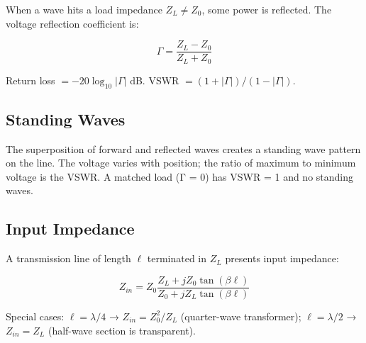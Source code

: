 				

When a wave hits a load impedance $Z_L \neq Z_0$, some power is reflected. The voltage reflection coefficient is:

				
\[\Gamma = \dfrac{Z_L - Z_0}{Z_L + Z_0}\]

				

Return loss $= -20\log_{10}|\Gamma|$ dB. VSWR $= (1+|\Gamma|)/(1-|\Gamma|)$.

				

\subsection{Standing Waves}

				

The superposition of forward and reflected waves creates a standing wave pattern on the line. The voltage varies with position; the ratio of maximum to minimum voltage is the VSWR. A matched load (Γ = 0) has VSWR = 1 and no standing waves.

				

\subsection{Input Impedance}

				

A transmission line of length $\ell$ terminated in $Z_L$ presents input impedance:

				
\[Z_{in} = Z_0 \dfrac{Z_L + jZ_0\tan(\beta\ell)}{Z_0 + jZ_L\tan(\beta\ell)}\]

				

Special cases: $\ell = \lambda/4$ → $Z_{in} = Z_0^2/Z_L$ (quarter-wave transformer); $\ell = \lambda/2$ → $Z_{in} = Z_L$ (half-wave section is transparent).



